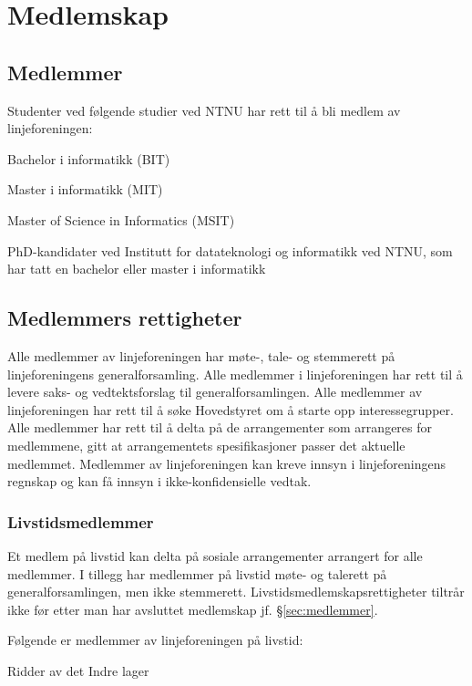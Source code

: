 \chapter{Medlemskap}\label{chapter:medlemskap}

\section{Medlemmer}{\label{sec:medlemmer}
\vspace{23pt}

Studenter ved følgende studier ved NTNU har rett til å bli medlem av linjeforeningen:
\begin{liste}
	\item Bachelor i informatikk (BIT)
	\item Master i informatikk (MIT)
	\item Master of Science in Informatics (MSIT)
    \item PhD-kandidater ved Institutt for datateknologi og informatikk ved NTNU, som har tatt en bachelor eller master i informatikk
\end{liste}
}
\section{Medlemmers rettigheter}
\vspace{23pt}
Alle medlemmer av linjeforeningen har møte-, tale- og stemmerett på linjeforeningens generalforsamling. Alle medlemmer i linjeforeningen har rett til å levere saks- og vedtektsforslag til generalforsamlingen. Alle medlemmer av linjeforeningen har rett til å søke Hovedstyret om å starte opp interessegrupper. Alle medlemmer har rett til å delta på de arrangementer som arrangeres for medlemmene, gitt at arrangementets spesifikasjoner passer det aktuelle medlemmet. Medlemmer av linjeforeningen kan kreve innsyn i linjeforeningens regnskap og kan få innsyn i ikke-konfidensielle vedtak.

\subsection{Livstidsmedlemmer}{
Et medlem på livstid kan delta på sosiale arrangementer arrangert for alle medlemmer. I tillegg har medlemmer på livstid møte- og talerett på generalforsamlingen, men ikke stemmerett. Livstidsmedlemskapsrettigheter tiltrår ikke før etter man har avsluttet medlemskap jf. §\ref{sec:medlemmer}.

Følgende er medlemmer av linjeforeningen på livstid:
\begin{liste}
	\item Ridder av det Indre lager
\end{liste}

}
